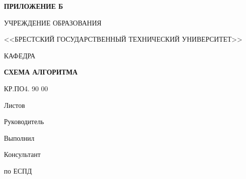 \begin{center}
    \hspace{.6\textwidth}\textbf{ПРИЛОЖЕНИЕ Б}

    \hspace{0pt}

    УЧРЕЖДЕНИЕ ОБРАЗОВАНИЯ

    <<БРЕСТСКИЙ ГОСУДАРСТВЕННЫЙ ТЕХНИЧЕСКИЙ УНИВЕРСИТЕТ>>

    \hspace{0pt}

    КАФЕДРА \titlePageKafedra
\end{center}

\vfill

\begin{center}
    \titlePageTopic

    \hspace{0pt}

    \textbf{СХЕМА АЛГОРИТМА}
\end{center}

\vfill

\begin{center}
    КР.ПО4. 90 00

    \hspace{0pt}

    Листов \pageref{LastPage}
\end{center}

\vfill

\begin{flushright}
    \begin{minipage}[t]{.49\textwidth}
        \begin{minipage}[t]{.75\textwidth}
            \begin{flushright}
                Руководитель

                Выполнил

                Консультант

                по ЕСПД
            \end{flushright}
        \end{minipage}
    \end{minipage}
    \begin{minipage}[t]{.49\textwidth}
        \begin{flushright}
            \begin{minipage}[t]{.75\textwidth}
                \titlePageTeacherName~\titlePageTeacherSurname

                \titlePageStudentName~\titlePageStudentSurname

                \hspace{0pt}

                \titlePageTeacherName~\titlePageTeacherSurname
            \end{minipage}
        \end{flushright}
        
    \end{minipage}
\end{flushright}

\vfill

\begin{center}
    \ESKDtheYear
\end{center}